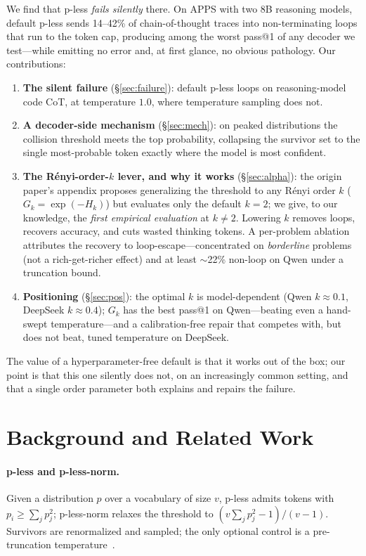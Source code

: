 \documentclass[11pt]{article}                       %
\newcommand{\tsum}{\ensuremath{\textstyle\sum}}
\begin{document}
We find that p-less \emph{fails silently} there. On APPS with two 8B reasoning models, default p-less
sends 14--42\% of chain-of-thought traces into non-terminating loops that run to the token cap,
producing among the worst pass@1 of any decoder we test---while emitting no error and, at first glance,
no obvious pathology. Our contributions:
\begin{enumerate}\itemsep2pt
  \item \textbf{The silent failure} (\S\ref{sec:failure}): default p-less loops on reasoning-model
    code CoT, at temperature $1.0$, where temperature sampling does not.
  \item \textbf{A decoder-side mechanism} (\S\ref{sec:mech}): on peaked distributions the collision
    threshold meets the top probability, collapsing the survivor set to the single most-probable
    token exactly where the model is most confident.
  \item \textbf{The R\'enyi-order-$k$ lever, and why it works} (\S\ref{sec:alpha}): the origin paper's
    appendix proposes generalizing the threshold to any R\'enyi order $k$ ($G_k{=}\exp(-H_k)$) but
    evaluates only the default $k{=}2$; we give, to our knowledge, the \emph{first empirical evaluation}
    at $k\neq2$. Lowering $k$ removes loops, recovers accuracy, and cuts wasted thinking tokens. A
    per-problem ablation attributes the recovery to loop-escape---concentrated on \emph{borderline}
    problems (not a rich-get-richer effect) and at least $\sim$22\% non-loop on Qwen under a truncation bound.
  \item \textbf{Positioning} (\S\ref{sec:pos}): the optimal $k$ is model-dependent (Qwen $k{\approx}0.1$,
    DeepSeek $k{\approx}0.4$); $G_k$ has the best pass@1 on Qwen---beating even a hand-swept
    temperature---and a calibration-free repair that competes with, but does not beat, tuned temperature
    on DeepSeek.
\end{enumerate}
The value of a hyperparameter-free default is that it works out of the box; our point is that this one
silently does not, on an increasingly common setting, and that a single order parameter both explains
and repairs the failure.

\section{Background and Related Work}\label{sec:bg}
\paragraph{p-less and p-less-norm.} Given a distribution $p$ over a vocabulary of size $v$, p-less
admits tokens with $p_i \ge \tsum_j p_j^2$; p-less-norm relaxes the threshold to
$(v\tsum_j p_j^2 - 1)/(v-1)$. Survivors are renormalized and sampled; the only optional control is a
pre-truncation temperature~\citep{tan2025pless}.
\end{document}
